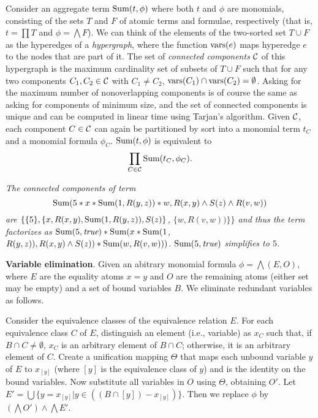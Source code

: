 Consider an aggregate term $\mbox{Sum}(t, \phi)$ where both $t$ and $\phi$ are
monomials, consisting of the sets $T$ and $F$ of atomic terms and formulae,
respectively (that is, $t = \prod T$ and $\phi = \bigwedge F$).
We can think of the
elements of the two-sorted set $T \cup F$ as the hyperedges of a
{\em hypergraph},
where the function $\mbox{vars}(e)$ maps hyperedge $e$ to the nodes that are
part of it.
The set of {\em connected components} ${\cal C}$ of this hypergraph is the
maximum cardinality set of subsets of $T \cup F$ such that for any
two components $C_1, C_2 \in {\cal C}$ with $C_1 \neq C_2$,
$\mbox{vars}(C_1) \cap \mbox{vars}(C_2) = \emptyset$. Asking for the maximum number of
nonoverlapping components is of course the same as asking for components of
minimum size, and the set of connected components is unique and can be computed
in linear time using Tarjan's algorithm. Given ${\cal C}$, each component
$C \in {\cal C}$ can again be partitioned by sort into a monomial term $t_C$
and a monomial formula $\phi_C$.
%
%
$\mbox{Sum}(t, \phi)$ is equivalent to
\[
\prod_{C \in {\cal C}} \AggSum(t_C, \phi_C).
\]

\begin{example}\em
The connected components of term
\[
\mbox{Sum}(5 * x * \mbox{Sum}(1, R(y, z)) * w, R(x,y) \land S(z) \land R(v, w))
\]
are
$\{ \{5\}, \{ x, R(x,y), \mbox{Sum}(1, R(y, z)), S(z) \}$,
$\{ w, R(v, w)) \} \}$
and thus the term factorizes as
$\mbox{Sum}(5, \textit{true}) *
\mbox{Sum}(x * \mbox{Sum}(1$, $R(y, z)), R(x, y) \land S(z)) *
\mbox{Sum}(w, R(v, w)))$.
$\mbox{Sum}(5, \textit{true})$ simplifies to $5$.
\punto
\end{example}


{\bf Variable elimination}.
Given an abitrary monomial formula $\phi = \bigwedge (E, O)$,
where $E$ are the equality
atoms $x=y$ and $O$ are the remaining atoms (either set may be empty) and
a set of bound variables $B$.
We eliminate redundant variables as follows.

Consider the equivalence classes of the equivalence relation $E$.
For each equivalence class $C$ of $E$, distinguish an element
(i.e., variable) as $x_C$ such that,
if $B \cap C \neq \emptyset$, $x_C$ is an arbitrary element of $B \cap C$;
otherwise, it is an arbitrary element of $C$.
Create a unification mapping
$\Theta$ that maps each unbound variable $y$ of $E$ to $x_{[y]}$ (where $[y]$ is the
equivalence class of $y$) and is the identity on the bound variables.
Now substitute all variables in $O$
using $\Theta$, obtaining $O'$. Let
$E' =  \bigcup \{ y = x_{[y]} | y \in ((B \cap [y]) -  x_{[y]}) \}$.
Then we replace $\phi$ by $(\bigwedge O') \land \bigwedge E'$.

